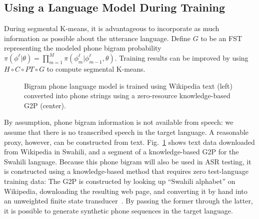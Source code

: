 \subsection{Using a Language Model During Training}
\label{sec:trainwithlm}

During segmental K-means, it is advantageous to incorporate as much
information as possible about the utterance language.
Define $G$ to be an FST representing the modeled phone bigram
probability
$\pi(\phi^\ell|\theta)=\prod_{m=1}^M\pi(\phi_m^\ell|\phi_{m-1}^\ell,\theta)$.
Training results can be improved by using $H\circ C\circ PT\circ G$ to
compute segmental K-means.

\begin{figure}
  \begin{center}
  \end{center}
  \vspace*{-3mm}
  \caption{Bigram phone language model is trained using Wikipedia text
    (left) converted into phone strings using a zero-resource
    knowledge-based G2P (center).}
  \label{fig:wikitext}
\end{figure}

By assumption, phone bigram information is not available from speech:
we assume that there is no transcribed speech in the target language.
A reasonable proxy, however, can be constructed from text.
Fig.~\ref{fig:wikitext} shows text data downloaded from Wikipedia in
Swahili, and a segment of a knowledge-based G2P for the Swahili
language.  Because this phone bigram will also be used
in ASR testing, it is constructed using a knowledge-based method
that requires zero test-language training data: The G2P is
constructed by looking up ``Swahili alphabet'' on Wikipedia,
downloading the resulting web page, and converting it by hand into
an unweighted finite state transducer~\cite{Hasegawajohnson15}.  By
passing the former through the latter, it is possible to generate
synthetic phone sequences in the target language.

